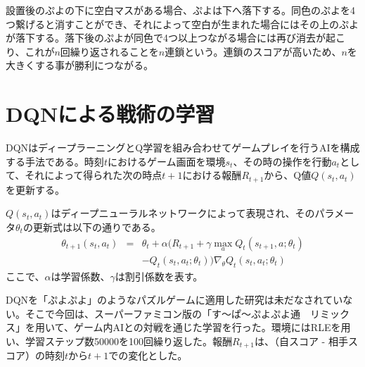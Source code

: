 \documentclass[twocolumn, a4paper]{UECIEresume}
\begin{document}
設置後のぷよの下に空白マスがある場合、ぷよは下へ落下する。同色のぷよを4つ繋げると消すことができ、それによって空白が生まれた場合にはその上のぷよが落下する。落下後のぷよが同色で4つ以上つながる場合には再び消去が起こり、これが$n$回繰り返されることを$n$連鎖という。連鎖のスコアが高いため、$n$を大きくする事が勝利につながる。



\section{DQNによる戦術の学習}
DQN\cite{dqn}はディープラーニングとQ学習を組み合わせてゲームプレイを行うAIを構成する手法である。時刻$t$におけるゲーム画面を環境$s_t$、その時の操作を行動$a_t$として、それによって得られた次の時点$t+1$における報酬$R_{t+1}$から、Q値$Q(s_t, a_t)$を更新する。

$Q(s_t, a_t)$はディープニューラルネットワークによって表現され、そのパラメータ$\theta_{t}$の更新式は以下の通りである。
\begin{eqnarray}
\theta_{t+1}(s_t, a_t) & = & \theta_t + \alpha (R_{t+1} + \gamma \max_a Q_t(s_{t+1}, a; \theta_t) \nonumber\\
& & - Q_t(s_t, a_t; \theta_t))\nabla_\theta Q_t(s_t, a_t; \theta_t)
\end{eqnarray}
ここで、$\alpha$は学習係数、$\gamma$は割引係数を表す。


DQNを「ぷよぷよ」のようなパズルゲームに適用した研究は未だなされていない。そこで今回は、スーパーファミコン版の「す〜ぱ〜ぷよぷよ通　リミックス」を用いて、ゲーム内AIとの対戦を通じた学習を行った。環境にはRLE\cite{RLE}を用い、学習ステップ数50000を100回繰り返した。報酬$R_{t+1}$は、（自スコア - 相手スコア）の時刻$t$から$t+1$での変化とした。
\end{document}
